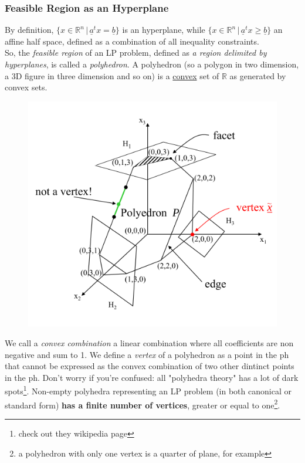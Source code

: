 \documentclass{article}
\begin{document}
			\subsubsection{Feasible Region as an Hyperplane}
				By definition, $\{x \in \mathbb{R}^n \,\vert\, \underline{a}^tx = \underline{b}\}$ is an hyperplane, while $\{x \in \mathbb{R}^n \,\vert\, \underline{a}^tx \geq \underline{b}\}$ an affine half space, defined as a combination of all inequality constraints.\\
				So, the \textit{feasible region} of an LP problem, defined as \textit{a region delimited by hyperplanes}, is called a \textit{polyhedron}. A polyhedron (so a polygon in two dimension, a 3D figure in three dimension and so on) is a \underline{convex} set of $\mathbb{R}$ as generated by convex sets.
				\begin{figure}[H]
					\centering
					\includegraphics{./images/Polyhedron1.png} %
				\end{figure}
				We call a \textit{convex combination} a linear combination where all coefficients are non negative and sum to 1. We define a \textit{vertex} of a polyhedron as a point in the ph that cannot be expressed as the convex combination of two other dintinct points in the ph. Don't worry if you're confused: all "polyhedra theory" has a lot of dark spots\footnote{check out they wikipedia page}. Non-empty polyhedra representing an LP problem (in both canonical or standard form) \textbf{has a finite number of vertices}, greater or equal to one\footnote{a polyhedron with only one vertex is a quarter of plane, for example}.\\
\end{document}
